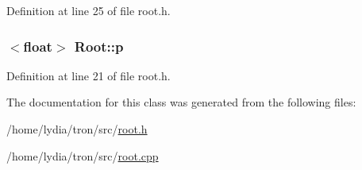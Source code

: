 Definition at line 25 of file root.\+h.

\hypertarget{class_root_ab5aafe8e23d36ecce6e94c6ea798335b}{
\subsubsection[{p}]{$<$float$>$ Root\+::p}}\label{class_root_ab5aafe8e23d36ecce6e94c6ea798335b}


Definition at line 21 of file root.\+h.



The documentation for this class was generated from the following files\+:\begin{DoxyCompactItemize}
\item 
/home/lydia/tron/src/\hyperlink{root_8h}{root.\+h}\item 
/home/lydia/tron/src/\hyperlink{root_8cpp}{root.\+cpp}\end{DoxyCompactItemize}
